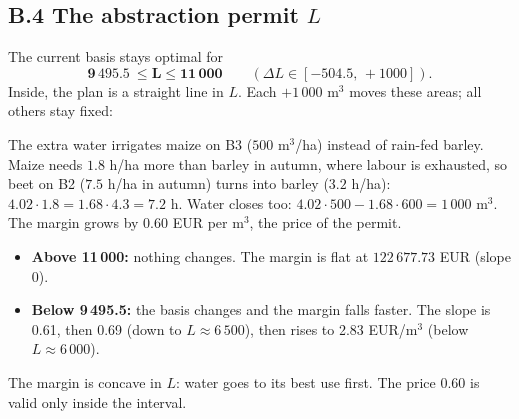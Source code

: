 \subsection*{B.4 \quad The abstraction permit $L$}

The current basis stays optimal for
\[
\mathbf{9\,495.5\ \le L\le 11\,000}\qquad(\Delta L\in[-504.5,\,+1000]).
\]
Inside, the plan is a straight line in $L$. Each $+1\,000$ m$^3$ moves these areas; all others stay fixed:



The extra water irrigates maize on B3 ($500$ m$^3$/ha) instead of rain-fed barley. Maize needs $1.8$ h/ha more than barley in autumn, where labour is exhausted, so beet on B2 ($7.5$ h/ha in autumn) turns into barley ($3.2$ h/ha): $4.02\cdot 1.8=1.68\cdot 4.3=7.2$ h. Water closes too: $4.02\cdot 500-1.68\cdot 600=1\,000$ m$^3$. The margin grows by $0.60$ EUR per m$^3$, the price of the permit.



\begin{itemize}
\item \textbf{Above 11\,000:} nothing changes. The margin is flat at $122\,677.73$ EUR (slope 0).
\item \textbf{Below 9\,495.5:} the basis changes and the margin falls faster. The slope is 0.61, then 0.69 (down to $L\approx 6\,500$), then rises to 2.83 EUR/m$^3$ (below $L\approx 6\,000$).\end{itemize}

The margin is concave in $L$: water goes to its best use first. The price $0.60$ is valid only inside the interval.
